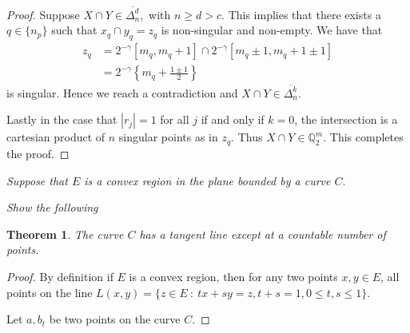 \documentclass[letter]{article}
\newtheorem{theorem}{Theorem}
\newenvironment{menumerate}{%
  \edef\backupindent{\the\parindent}%
  \enumerate%
  \setlength{\parindent}{\backupindent}%
}{\endenumerate}
\begin{document}
\begin{menumerate}
\begin{menumerate}
\begin{proof}
					Suppose $X \cap Y \in \overline{\Delta_n^d},$ with $n \geq d > c$.  This implies that there exists a $q \in \{n_p\}$ such that $x_q \cap y_q = z_q$ is non-singular and non-empty. We have that
					\begin{equation*}
						\begin{aligned}
							z_q &= 2^{-\gamma}[m_q, m_q+1]\cap  2^{-\gamma}[m_q \pm 1, m_q+1 \pm 1] \\
								&= 2^{-\gamma}\left\{m_q+\frac{1\pm1}{2}\right\}
						\end{aligned}
					\end{equation*}
					is singular. Hence we reach a contradiction and $X\cap Y \in \overline{\Delta_n^k}. $

					Lastly in the case that $|r_j| = 1$ for all $j$ if and only if $k = 0$, the intersection is a cartesian product of $n$ singular points as in $z_q.$ Thus $X\cap Y \in \mathbb{Q}_2^m$. This completes the proof.

 				\end{proof}
		\end{menumerate} 


		\setcounter{enumi}{31}
		\item \textit{Suppose that $E$ is a convex region in the plane bounded by a curve $C.$}
			\begin{menumerate}
				\item \textit{Show the following}
					\begin{theorem}
						The curve $C$ has a tangent line except at a countable number of points.
					\end{theorem}

					\begin{proof}
						By definition if $E$ is a convex region, then for any two points $x,y \in E$, all points on the line $L(x,y) = \{z \in E\ :\ tx +sy = z, t+s = 1, 0 \leq t,s\leq 1\}.$ 

						Let $a,b_t$ be two points on the curve $C$. 
					\end{proof} 
			\end{menumerate} 

		
		
\end{menumerate}
\end{document}
